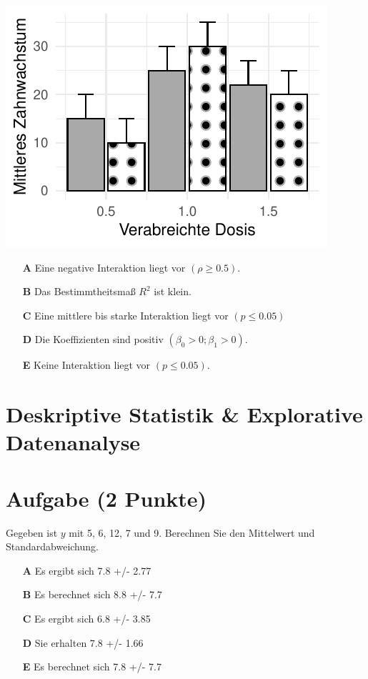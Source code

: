 \documentclass[a4paper, 9pt]{scrartcl}\usepackage[]{graphicx}\usepackage[]{xcolor}
\makeatletter
\def\maxwidth{ %
  \ifdim\Gin@nat@width>\linewidth
    \linewidth
  \else
    \Gin@nat@width
  \fi
}
\makeatother
\begin{document}
{\centering \includegraphics[width=\maxwidth]{img/mc-anova-02-a-1} 

}







\begin{enumerate}
\item [\textbf{A} \msquare] Eine negative Interaktion liegt vor $(\rho \geq 0.5)$.
\item [\textbf{B} \msquare] Das Bestimmtheitsmaß $R^2$ ist klein.
\item [\textbf{C} \msquare] Eine mittlere bis starke Interaktion liegt vor $(p \leq 0.05)$
\item [\textbf{D} \msquare] Die Koeffizienten sind positiv $(\beta_0 > 0; \beta_1 > 0)$.
\item [\textbf{E} \msquare] Keine Interaktion liegt vor $(p \leq 0.05)$.
\end{enumerate} 
\section*{Deskriptive Statistik \& Explorative Datenanalyse}

\section{Aufgabe \hfill (2 Punkte)}




Gegeben ist $y$ mit 5, 6, 12, 7 und 9. Berechnen Sie den Mittelwert und Standardabweichung.



\begin{enumerate}
\item [\textbf{A} \msquare] Es ergibt sich 7.8 +/- 2.77
\item [\textbf{B} \msquare] Es berechnet sich 8.8 +/- 7.7
\item [\textbf{C} \msquare] Es ergibt sich 6.8 +/- 3.85
\item [\textbf{D} \msquare] Sie erhalten 7.8 +/- 1.66
\item [\textbf{E} \msquare] Es berechnet sich 7.8 +/- 7.7
\end{enumerate} 
\end{document}
